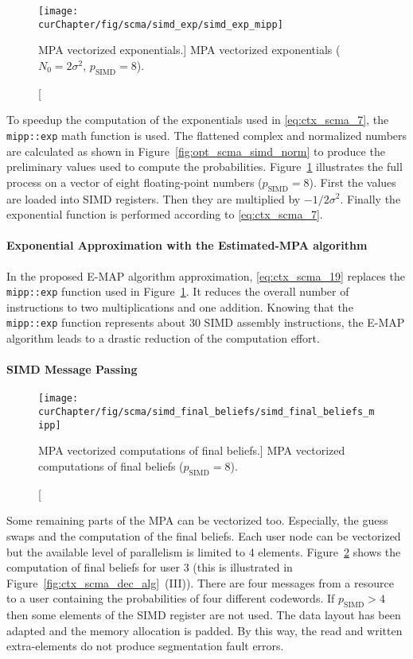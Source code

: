 \begin{figure}[htp]
  \centering
  \texttt{[image: \\curChapter/fig/scma/simd\_exp/simd\_exp\_mipp]}
  \caption
    [MPA vectorized exponentials.]
    {MPA vectorized exponentials ($N_0 = 2\sigma^2$, $p_\text{SIMD} = 8$).}
  \label{fig:opt_scma_simd_exp}
\end{figure}

To speedup the computation of the exponentials used in \eqref{eq:ctx_scma_7},
the \verb|mipp::exp| math function is used. The flattened complex and normalized
numbers are calculated as shown in Figure~\ref{fig:opt_scma_simd_norm} to
produce the preliminary values used to compute the probabilities.
Figure~\ref{fig:opt_scma_simd_exp} illustrates the full process on a vector of
eight floating-point numbers ($p_\text{SIMD} = 8$). First the values are loaded
into SIMD registers. Then they are multiplied by $-1/2\sigma^2$. Finally the
exponential function is performed according to \eqref{eq:ctx_scma_7}.

\paragraph{Exponential Approximation with the Estimated-MPA algorithm}

In the proposed E-MAP algorithm approximation, \eqref{eq:ctx_scma_19} replaces
the \verb|mipp::exp| function used in Figure~\ref{fig:opt_scma_simd_exp}. It
reduces the overall number of instructions to two multiplications and one
addition. Knowing that the \verb|mipp::exp| function represents about 30 SIMD
assembly instructions, the E-MAP algorithm leads to a drastic reduction of the
computation effort.

\paragraph{SIMD Message Passing}

\begin{figure}[htp]
  \centering
  \texttt{[image: \\curChapter/fig/scma/simd\_final\_beliefs/simd\_final\_beliefs\_mipp]}
  \caption
    [MPA vectorized computations of final beliefs.]
    {MPA vectorized computations of final beliefs ($p_\text{SIMD} = 8$).}
  \label{fig:opt_scma_simd_final_guess}
\end{figure}

Some remaining parts of the MPA can be vectorized too. Especially, the guess
swaps and the computation of the final beliefs. Each user node can be
vectorized but the available level of parallelism is limited to 4 elements.
Figure~\ref{fig:opt_scma_simd_final_guess} shows the computation of final
beliefs for user 3 (this is illustrated in
Figure~\ref{fig:ctx_scma_dec_alg}~(III)). There are four messages from a
resource to a user containing the probabilities of four different codewords. If
$p_\text{SIMD} > 4$ then some elements of the SIMD register are not used. The
data layout has been adapted and the memory allocation is padded. By this way,
the read and written extra-elements do not produce segmentation fault errors.

